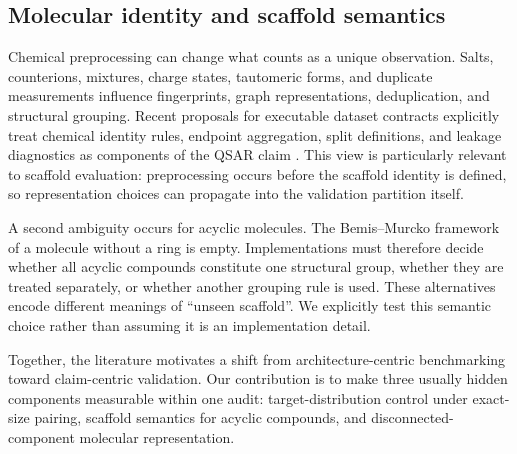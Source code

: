 \subsection{Molecular identity and scaffold semantics}

Chemical preprocessing can change what counts as a unique observation. Salts, counterions, mixtures, charge states, tautomeric forms, and duplicate measurements influence fingerprints, graph representations, deduplication, and structural grouping. Recent proposals for executable dataset contracts explicitly treat chemical identity rules, endpoint aggregation, split definitions, and leakage diagnostics as components of the QSAR claim \citep{nael2026dataset}. This view is particularly relevant to scaffold evaluation: preprocessing occurs before the scaffold identity is defined, so representation choices can propagate into the validation partition itself.

A second ambiguity occurs for acyclic molecules. The Bemis--Murcko framework of a molecule without a ring is empty. Implementations must therefore decide whether all acyclic compounds constitute one structural group, whether they are treated separately, or whether another grouping rule is used. These alternatives encode different meanings of ``unseen scaffold''. We explicitly test this semantic choice rather than assuming it is an implementation detail.

Together, the literature motivates a shift from architecture-centric benchmarking toward claim-centric validation. Our contribution is to make three usually hidden components measurable within one audit: target-distribution control under exact-size pairing, scaffold semantics for acyclic compounds, and disconnected-component molecular representation.
